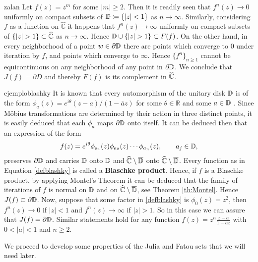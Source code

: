 \begin{myexmp}{}{zalan}
Let $f(z) = z^m$ for some $|m|\geq 2$. Then it is readily seen that $f^n(z)\rightarrow 0$ uniformly on compact subsets of $\mathbb{D}\coloneqq \{|z|<1\}$  as $n\rightarrow \infty$. Similarly, considering $f$ as a function on $\widehat{\mathbb{C}}$ it happens that $f^n(z)\rightarrow \infty$ uniformly on compact subsets of $\{|z|>1\}\subset \C$ as $n\rightarrow \infty$. Hence $\D\cup \{|z|>1\} \subset F(f)$. On the other hand, in every neighborhood of a point $w\in \partial \mathbb{D}$ there are points which converge to $0$ under iteration by $f$, and points which converge to $\infty$. Hence $\{f^n\}_{n\geq 1}$ cannot be equicontinuous on any neighborhood of any point in $\partial \mathbb{D}$. We conclude that $J(f)=\partial D$ and thereby $F(f)$ is its complement in $\widehat{\mathbb{C}}$.   
\end{myexmp}

\begin{myexmp}{}{ejemploblashky}
It is known that every automorphism of the unitary disk $\mathbb{D}$ is of the form $\phi_a(z) = e^{i\theta}(z-a)/(1-\overline{a}z)$ for some $\theta\in \mathbb{R}$ and some $a\in \mathbb{D}$ \cite[Chapter 8, Theorem 2.2]{stein}. Since Möbius transformations are determined by their action in three distinct points, it is easily deduced that each $\phi_a$ maps $\partial \mathbb{D}$ onto itself. It can be deduced then that an expression of the form
\begin{equation}\label{defblashky}
f(z) = e^{i\theta} \phi_{a_1}(z)\phi_{a_2}(z)\cdots \phi_{a_n}(z), \qquad a_j\in \mathbb{D},
\end{equation}
preserves $\partial \mathbb{D}$ and carries $\mathbb{D}$ onto $\mathbb{D}$ and $\widehat{\mathbb{C}} \setminus \overline{\mathbb{D}}$ onto $\widehat{\mathbb{C}} \setminus \overline{\mathbb{D}}$. Every function as in Equation \eqref{defblashky} is called a {\bf Blaschke product}. Hence, if $f$ is a Blaschke product, by applying Montel's Theorem it can be deduced that the family of iterations of $f$ is normal on $\mathbb{D}$ and on $\widehat{\mathbb{C}} \setminus \overline{\mathbb{D}}$, see Theorem \ref{th:Montel}. Hence $J(f)\subset \partial \mathbb{D}$. Now, suppose that some factor in \eqref{defblashky} is $\phi_0(z)=z^2$, then $f^n(z) \rightarrow 0$ if $|z|<1$ and $f^n(z) \rightarrow \infty$ if $|z|>1$. So in this case we can assure that $J(f) = \partial \mathbb{D}$. Similar statements hold for any function $f(z)=z^n\frac{z-a}{1-\overline{a}z}$ with $0<|a|<1$ and $n\geq 2$.
\end{myexmp}

We proceed to develop some properties of the Julia and Fatou sets that we will need later.\\

